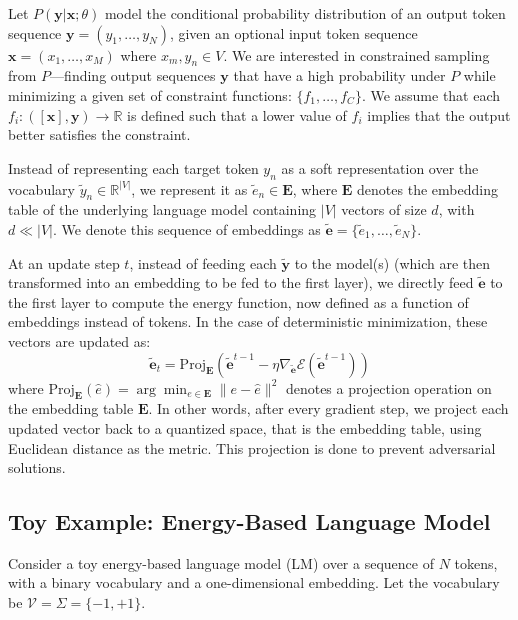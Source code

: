 \documentclass{article}
\begin{document}
Let \( P(\boldsymbol{y} | \boldsymbol{x}; \theta) \) model the conditional probability distribution of an output token sequence \( \boldsymbol{y} = (y_1, \ldots, y_N) \), given an optional input token sequence \( \boldsymbol{x} = (x_1, \ldots, x_M) \) where \( x_m, y_n \in V \). We are interested in constrained sampling from \( P \)—finding output sequences \( \boldsymbol{y} \) that have a high probability under \( P \) while minimizing a given set of constraint functions: \(\{f_1, \ldots, f_C\}\). We assume that each \( f_i : ([\boldsymbol{x}], \boldsymbol{y}) \rightarrow \mathbb{R} \) is defined such that a lower value of \( f_i \) implies that the output better satisfies the constraint.

Instead of representing each target token \( y_n \) as a soft representation over the vocabulary \( \tilde{y}_n \in \mathbb{R}^{|V|} \), we represent it as \( \tilde{e}_n \in \boldsymbol{E} \), where \( \boldsymbol{E} \) denotes the embedding table of the underlying language model containing \( |V| \) vectors of size \( d \), with \( d \ll |V| \). We denote this sequence of embeddings as \( \tilde{\boldsymbol{e}} = \{\tilde{e}_1, \ldots, \tilde{e}_N\} \).

At an update step \( t \), instead of feeding each \( \tilde{\boldsymbol{y}} \) to the model(s) (which are then transformed into an embedding to be fed to the first layer), we directly feed \( \tilde{\boldsymbol{e}} \) to the first layer to compute the energy function, now defined as a function of embeddings instead of tokens. In the case of deterministic minimization, these vectors are updated as:
\[ \tilde{\boldsymbol{e}}_t = \text{Proj}_{\boldsymbol{E}}\left(\tilde{\boldsymbol{e}}^{t-1} - \eta \nabla_{\tilde{\boldsymbol{e}}} \mathcal{E}(\tilde{\boldsymbol{e}}^{t-1})\right) \]
where \( \text{Proj}_{\boldsymbol{E}}(\hat{e}) = \arg\min_{e \in \boldsymbol{E}} \|e - \hat{e}\|^2 \) denotes a projection operation on the embedding table \( \boldsymbol{E} \). In other words, after every gradient step, we project each updated vector back to a quantized space, that is the embedding table, using Euclidean distance as the metric. This projection is done to prevent adversarial solutions.


\subsection{Toy Example: Energy-Based Language Model}
Consider a toy energy-based language model (LM) over a sequence of \(N\) tokens, with a binary vocabulary and a one-dimensional embedding. Let the vocabulary be \(\mathcal{V} = \Sigma = \{-1, +1\}\).
\end{document}
